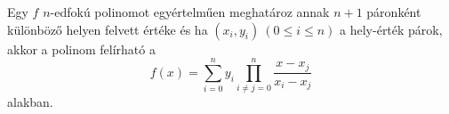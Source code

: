 \begin{theorem}[\Wrap{content/magyar=Lagrange-interpoláció, content/english=Lagrange interpolation}]
  Egy $f$ $n$-edfokú polinomot egyértelműen meghatároz annak $n+1$ páronként különböző helyen
  felvett értéke és ha $(x_i, y_i)\ (0\le i\le n)$ a hely-érték párok, akkor a polinom felírható a
  \[
    f(x) = \sum_{i=0}^n y_i\prod_{i\neq j=0}^n\frac{x-x_j}{x_i-x_j}
  \] alakban.
\end{theorem}